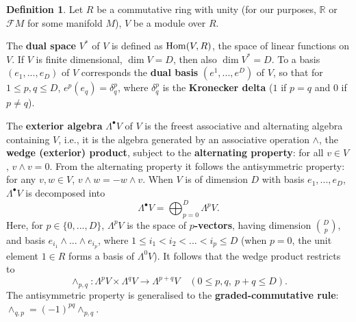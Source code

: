 \documentclass{elsarticle}
\theoremstyle{definition}
\newtheorem{definition}[theorem]{Definition}
\newcommand{\Hom}{\mathop{\rm Hom}\nolimits}
\newcommand{\R}{\mathbb{R}}
\newcommand{\newterm}[1]{\textbf{#1}}
\begin{document}
\begin{definition}
  Let $R$ be a commutative ring with unity (for our purposes, $\R$ or $\mathcal{F} M$ for some manifold $M$), $V$ be a module over $R$.

  The \newterm{dual space} $V^*$ of $V$ is defined as $\Hom(V, R)$, the space of linear functions on $V$.
  If $V$ is finite dimensional, $\dim V = D$, then also $\dim V^* = D$.
  To a basis $(e_1, ..., e_D)$ of $V$ corresponds the \newterm{dual basis} $(e^1, ..., e^D)$ of $V$, so that for $1 \leq p, q \leq D$, $e^p(e_q) = \delta^p_q$, where $\delta^p_q$ is the \newterm{Kronecker delta} ($1$ if $p = q$ and $0$ if $p \neq q$).

  The \newterm{exterior algebra} $\Lambda^\bullet V$ of $V$ is the freest associative and alternating algebra containing $V$, i.e.,
  it is the algebra generated by an associative operation $\wedge$, the \newterm{wedge (exterior) product},
  subject to the \newterm{alternating property}: for all $v \in V$, $v \wedge v = 0$.
  From the alternating property it follows the antisymmetric property:
  for any $v, w \in V$, $v \wedge w = - w \wedge v$.
  When $V$ is of dimension $D$ with basis $e_1, ..., e_D$, $\Lambda^\bullet V$ is decomposed into
  \begin{equation}
    \Lambda^\bullet V = \bigoplus_{p = 0}^D \Lambda^p V.
  \end{equation}
  Here, for $p \in \{0, ..., D\}$, $\Lambda^p V$ is the space of \newterm{$p$-vectors}, having dimension $\binom{D}{p}$, and basis $e_{i_1} \wedge ... \wedge e_{i_p}$, where
  $1 \leq i_1 < i_2 < ... < i_p \leq D$
  (when $p = 0$, the unit element $1 \in R$ forms a basis of $\Lambda^0 V$).
  It follows that the wedge product restricts to
  \begin{equation}
    \wedge_{p, q} \colon \Lambda^p V \times \Lambda^q V \to \Lambda^{p + q} V\quad
      (0 \leq p, q,\ p + q \leq D).
  \end{equation}
  The antisymmetric property is generalised to the \newterm{graded-commutative rule}:
  $\wedge_{q, p} = (-1)^{p q} \wedge_{p, q}$.
\end{definition}
\end{document}
